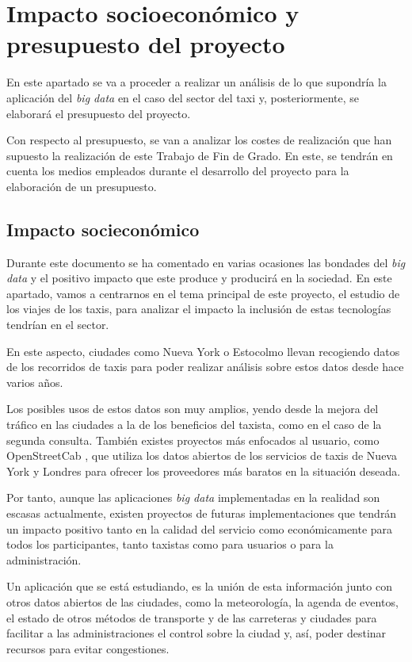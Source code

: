 \chapter{Impacto socioeconómico y presupuesto del proyecto \label{sec:presupuesto}}
En este apartado se va a proceder a realizar un análisis de lo que supondría la aplicación del \textit{big data} en el caso del sector del taxi y, posteriormente, se elaborará el presupuesto del proyecto.

Con respecto al presupuesto, se van a analizar los costes de realización que han supuesto la realización de este Trabajo de Fin de Grado. En este, se tendrán en cuenta los medios empleados durante el desarrollo del proyecto para la elaboración de un presupuesto.

\section{Impacto socieconómico}
Durante este documento se ha comentado en varias ocasiones las bondades del \textit{big data} y el positivo impacto que este produce y producirá en la sociedad. En este apartado, vamos a centrarnos en el tema principal de este proyecto, el estudio de los viajes de los taxis, para analizar el impacto la inclusión de estas tecnologías tendrían en el sector.

En este aspecto, ciudades como Nueva York \cite{taxiTrips} o Estocolmo \cite{impacto1} llevan recogiendo datos de los recorridos de taxis para poder realizar análisis sobre estos datos desde hace varios años.

Los posibles usos de estos datos son muy amplios, yendo desde la mejora del tráfico en las ciudades a la de los beneficios del taxista, como en el caso de la segunda consulta. También existes proyectos más enfocados al usuario, como OpenStreetCab \cite{openstreetcab}, que utiliza los datos abiertos de los servicios de taxis de Nueva York y Londres para ofrecer los proveedores más baratos en la situación deseada.

Por tanto, aunque las aplicaciones \textit{big data} implementadas en la realidad son escasas actualmente, existen proyectos de futuras implementaciones que tendrán un impacto positivo tanto en la calidad del servicio como económicamente para todos los participantes, tanto taxistas como para usuarios o para la administración.

Un aplicación que se está estudiando, es la unión de esta información junto con otros datos abiertos de las ciudades, como la meteorología, la agenda de eventos, el estado de otros métodos de transporte y de las carreteras y ciudades para facilitar a las administraciones el control sobre la ciudad y, así, poder destinar recursos para evitar congestiones.

